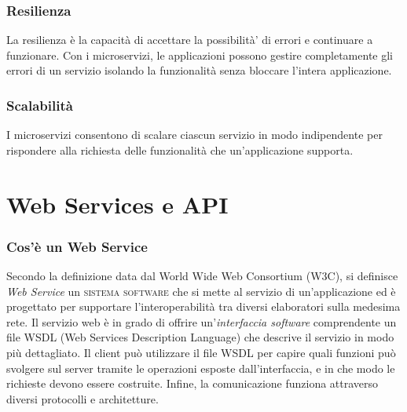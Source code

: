 \subsubsection{Resilienza}
La resilienza è la capacità di accettare la possibilità’ di errori e continuare a funzionare. Con i microservizi, le applicazioni possono gestire completamente gli errori di un servizio isolando la funzionalità senza bloccare l’intera applicazione.

\subsubsection{Scalabilità}
I microservizi consentono di scalare ciascun servizio in modo indipendente per rispondere alla richiesta delle funzionalità che un'applicazione supporta. 


\section{Web Services e API}

\subsubsection{Cos'è un Web Service}
Secondo la definizione data dal World Wide Web Consortium (W3C), si definisce \emph{Web Service} un \textsc{sistema software} che si mette al servizio di un'applicazione ed è progettato per supportare l'interoperabilità tra diversi elaboratori sulla medesima rete. \cite{w3c:webservices} Il servizio web è in grado di offrire un’\textit{interfaccia software} comprendente un file WSDL (Web Services Description Language) che descrive il servizio in modo più dettagliato. Il client può utilizzare il file WSDL per capire quali funzioni può svolgere sul server tramite le operazioni esposte dall'interfaccia, e in che modo le richieste devono essere costruite. Infine, la comunicazione funziona attraverso diversi protocolli e architetture. 

